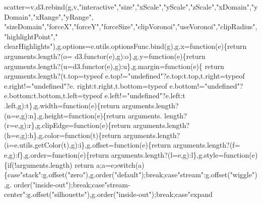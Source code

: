 \begin{DoxyCode}
      scatter=v,d3.rebind(g,v,\textcolor{stringliteral}{"interactive"},\textcolor{stringliteral}{"size"},\textcolor{stringliteral}{"xScale"},\textcolor{stringliteral}{"yScale"},\textcolor{stringliteral}{"zScale"},\textcolor{stringliteral}{"xDomain"},\textcolor{stringliteral}{"yDomain"},\textcolor{stringliteral}{"xRange"},\textcolor{stringliteral}{"yRange"},\textcolor{stringliteral}{
      "sizeDomain"},\textcolor{stringliteral}{"forceX"},\textcolor{stringliteral}{"forceY"},\textcolor{stringliteral}{"forceSize"},\textcolor{stringliteral}{"clipVoronoi"},\textcolor{stringliteral}{"useVoronoi"},\textcolor{stringliteral}{"clipRadius"},\textcolor{stringliteral}{"highlightPoint"},\textcolor{stringliteral}{"
      clearHighlights"}),g.options=e.utils.optionsFunc.bind(g),g.x=\textcolor{keyword}{function}(e)\{\textcolor{keywordflow}{return} arguments.length?(o=
      d3.functor(e),g):o\},g.y=\textcolor{keyword}{function}(e)\{\textcolor{keywordflow}{return} arguments.length?(u=d3.functor(e),g):u\},g.margin=\textcolor{keyword}{function}(e)\{\textcolor{keywordflow}{
      return} arguments.length?(t.top=typeof e.top!=\textcolor{stringliteral}{"undefined"}?e.top:t.top,t.right=typeof e.right!=\textcolor{stringliteral}{"undefined"}?e.
      right:t.right,t.bottom=typeof e.bottom!=\textcolor{stringliteral}{"undefined"}?e.bottom:t.bottom,t.left=typeof e.left!=\textcolor{stringliteral}{"undefined"}?e.left:t
      .left,g):t\},g.width=\textcolor{keyword}{function}(e)\{\textcolor{keywordflow}{return} arguments.length?(n=e,g):n\},g.height=\textcolor{keyword}{function}(e)\{\textcolor{keywordflow}{return} arguments.
      length?(r=e,g):r\},g.clipEdge=\textcolor{keyword}{function}(e)\{\textcolor{keywordflow}{return} arguments.length?(h=e,g):h\},g.color=\textcolor{keyword}{function}(t)\{\textcolor{keywordflow}{return} 
      arguments.length?(i=e.utils.getColor(t),g):i\},g.offset=\textcolor{keyword}{function}(e)\{\textcolor{keywordflow}{return} arguments.length?(f=
      e,g):f\},g.order=\textcolor{keyword}{function}(e)\{\textcolor{keywordflow}{return} arguments.length?(l=e,g):l\},g.style=\textcolor{keyword}{function}(e)\{\textcolor{keywordflow}{if}(!arguments.length)\textcolor{keywordflow}{
      return} a;a=e;\textcolor{keywordflow}{switch}(a)\{\textcolor{keywordflow}{case}\textcolor{stringliteral}{"stack"}:g.offset(\textcolor{stringliteral}{"zero"}),g.order(\textcolor{stringliteral}{"default"});\textcolor{keywordflow}{break};\textcolor{keywordflow}{case}\textcolor{stringliteral}{"stream"}:g.offset(\textcolor{stringliteral}{"wiggle"}),g.
      order(\textcolor{stringliteral}{"inside-out"});\textcolor{keywordflow}{break};\textcolor{keywordflow}{case}\textcolor{stringliteral}{"stream-center"}:g.offset(\textcolor{stringliteral}{"silhouette"}),g.order(\textcolor{stringliteral}{"inside-out"});\textcolor{keywordflow}{break};\textcolor{keywordflow}{case}\textcolor{stringliteral}{"expand
}
\end{DoxyCode}
